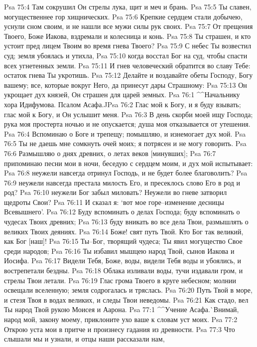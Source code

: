Psa 75:4  Там сокрушил Он стрелы лука, щит и меч и брань.
Psa 75:5  Ты славен, могущественнее гор хищнических.
Psa 75:6  Крепкие сердцем стали добычею, уснули сном своим, и не нашли все мужи силы рук своих.
Psa 75:7  От прещения Твоего, Боже Иакова, вздремали и колесница и конь.
Psa 75:8  Ты страшен, и кто устоит пред лицем Твоим во время гнева Твоего?
Psa 75:9  С небес Ты возвестил суд; земля убоялась и утихла,
Psa 75:10  когда восстал Бог на суд, чтобы спасти всех угнетенных земли.
Psa 75:11  И гнев человеческий обратится во славу Тебе: остаток гнева Ты укротишь.
Psa 75:12  Делайте и воздавайте обеты Господу, Богу вашему; все, которые вокруг Него, да принесут дары Страшному:
Psa 75:13  Он укрощает дух князей, Он страшен для царей земных.
Psa 76:1  ^^Начальнику хора Идифумова. Псалом Асафа.^^
Psa 76:2  Глас мой к Богу, и я буду взывать; глас мой к Богу, и Он услышит меня.
Psa 76:3  В день скорби моей ищу Господа; рука моя простерта ночью и не опускается; душа моя отказывается от утешения.
Psa 76:4  Вспоминаю о Боге и трепещу; помышляю, и изнемогает дух мой.
Psa 76:5  Ты не даешь мне сомкнуть очей моих; я потрясен и не могу говорить.
Psa 76:6  Размышляю о днях древних, о летах веков [минувших];
Psa 76:7  припоминаю песни мои в ночи, беседую с сердцем моим, и дух мой испытывает:
Psa 76:8  неужели навсегда отринул Господь, и не будет более благоволить?
Psa 76:9  неужели навсегда престала милость Его, и пресеклось слово Его в род и род?
Psa 76:10  неужели Бог забыл миловать? Неужели во гневе затворил щедроты Свои?
Psa 76:11  И сказал я: `вот мое горе--изменение десницы Всевышнего'.
Psa 76:12  Буду вспоминать о делах Господа; буду вспоминать о чудесах Твоих древних;
Psa 76:13  буду вникать во все дела Твои, размышлять о великих Твоих деяниях.
Psa 76:14  Боже! свят путь Твой. Кто Бог так великий, как Бог [наш]!
Psa 76:15  Ты--Бог, творящий чудеса; Ты явил могущество Свое среди народов;
Psa 76:16  Ты избавил мышцею народ Твой, сынов Иакова и Иосифа.
Psa 76:17  Видели Тебя, Боже, воды, видели Тебя воды и убоялись, и вострепетали бездны.
Psa 76:18  Облака изливали воды, тучи издавали гром, и стрелы Твои летали.
Psa 76:19  Глас грома Твоего в круге небесном; молнии освещали вселенную; земля содрогалась и тряслась.
Psa 76:20  Путь Твой в море, и стезя Твоя в водах великих, и следы Твои неведомы.
Psa 76:21  Как стадо, вел Ты народ Твой рукою Моисея и Аарона.
Psa 77:1  ^^Учение Асафа.^^ Внимай, народ мой, закону моему, приклоните ухо ваше к словам уст моих.
Psa 77:2  Открою уста мои в притче и произнесу гадания из древности.
Psa 77:3  Что слышали мы и узнали, и отцы наши рассказали нам,

